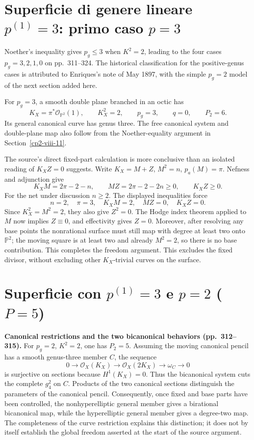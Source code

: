 \section{Superficie di genere lineare \texorpdfstring{$p^{(1)}=3$}{p(1)=3}: primo caso \texorpdfstring{$p=3$}{p=3}}
\label{cp2-viii-17}

Noether's inequality gives \(p_g\leq3\) when \(K^2=2\), leading to the four cases \(p_g=3,2,1,0\) on pp.~311--324. The historical classification for the positive-genus cases is attributed to Enriques's note of May 1897, with the simple \(p_g=2\) model of the next section added here.

For \(p_g=3\), a smooth double plane branched in an octic has
\[
K_X=\pi^*\mathcal O_{\mathbb P^2}(1),\qquad
K_X^2=2,\qquad p_g=3,\qquad q=0,\qquad P_2=6.
\]
Its general canonical curve has genus three. The free canonical system and double-plane map also follow from the Noether-equality argument in Section~\ref{cp2-viii-11}.

The source's direct fixed-part calculation is more conclusive than an isolated reading of \(K_XZ=0\) suggests. Write \(K_X=M+Z\), \(M^2=n\), \(p_a(M)=\pi\). Nefness and adjunction give
\[
K_XM=2\pi-2-n,\qquad MZ=2\pi-2-2n\geq0,\qquad K_XZ\geq0.
\]
For the net under discussion \(n\geq2\). The displayed inequalities force
\[
n=2,\quad \pi=3,\quad K_XM=2,\quad MZ=0,\quad K_XZ=0.
\]
Since \(K_X^2=M^2=2\), they also give \(Z^2=0\). The Hodge index theorem applied to \(M\) now implies \(Z\equiv0\), and effectivity gives \(Z=0\). Moreover, after resolving any base points the nonrational surface must still map with degree at least two onto \(\mathbb P^2\); the moving square is at least two and already \(M^2=2\), so there is no base contribution. This completes the freedom argument. This excludes the fixed divisor, without excluding other \(K_X\)-trivial curves on the surface.

\section{Superficie con \texorpdfstring{$p^{(1)}=3$}{p(1)=3} e \texorpdfstring{$p=2$}{p=2} (\texorpdfstring{$P=5$}{P=5})}
\label{cp2-viii-18}

\textbf{Canonical restrictions and the two bicanonical behaviors (pp.~312--315).}
For \(p_g=2\), \(K^2=2\), one has \(P_2=5\). Assuming the moving canonical pencil has a smooth genus-three member \(C\), the sequence
\[
0\longrightarrow\mathcal O_X(K_X)\longrightarrow
\mathcal O_X(2K_X)\longrightarrow\omega_C\longrightarrow0
\]
is surjective on sections because \(H^1(K_X)=0\). Thus the bicanonical system cuts the complete \(g^2_4\) on \(C\). Products of the two canonical sections distinguish the parameters of the canonical pencil. Consequently, once fixed and base parts have been controlled, the nonhyperelliptic general member gives a birational bicanonical map, while the hyperelliptic general member gives a degree-two map. The completeness of the curve restriction explains this distinction; it does not by itself establish the global freedom asserted at the start of the source argument.

